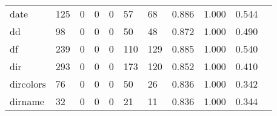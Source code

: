 \begin{longtable}{lp{1.2cm}p{1.2cm}p{1.2cm}p{1.2cm}p{1.2cm}p{1.2cm}p{1.2cm}p{1.2cm}p{1.2cm}p{1.2cm}}
date      &                                   125 &                                                  0 &                                                  0 &                                                  0 &                                                 57 &                                                 68 &                                              0.886 &                                              1.000 &                                              0.544 \\
dd        &                                    98 &                                                  0 &                                                  0 &                                                  0 &                                                 50 &                                                 48 &                                              0.872 &                                              1.000 &                                              0.490 \\
df        &                                   239 &                                                  0 &                                                  0 &                                                  0 &                                                110 &                                                129 &                                              0.885 &                                              1.000 &                                              0.540 \\
dir       &                                   293 &                                                  0 &                                                  0 &                                                  0 &                                                173 &                                                120 &                                              0.852 &                                              1.000 &                                              0.410 \\
dircolors &                                    76 &                                                  0 &                                                  0 &                                                  0 &                                                 50 &                                                 26 &                                              0.836 &                                              1.000 &                                              0.342 \\
dirname   &                                    32 &                                                  0 &                                                  0 &                                                  0 &                                                 21 &                                                 11 &                                              0.836 &                                              1.000 &                                              0.344 \\

\end{longtable}
